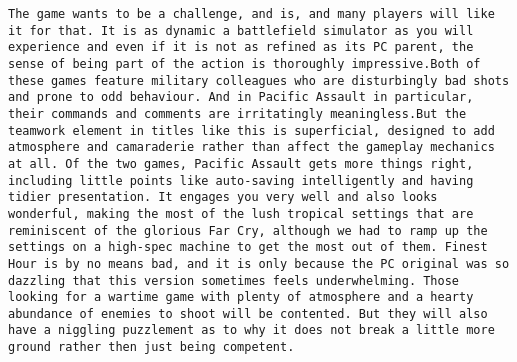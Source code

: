 \documentclass[11pt]{article}
\begin{document}
\begin{Verbatim}[commandchars=\\\{\}]
The game wants to be a challenge, and is, and many players will like it for that. It is as dynamic a battlefield simulator as you will experience and even if it is not as refined as its PC parent, the sense of being part of the action is thoroughly impressive.Both of these games feature military colleagues who are disturbingly bad shots and prone to odd behaviour. And in Pacific Assault in particular, their commands and comments are irritatingly meaningless.But the teamwork element in titles like this is superficial, designed to add atmosphere and camaraderie rather than affect the gameplay mechanics at all. Of the two games, Pacific Assault gets more things right, including little points like auto-saving intelligently and having tidier presentation. It engages you very well and also looks wonderful, making the most of the lush tropical settings that are reminiscent of the glorious Far Cry, although we had to ramp up the settings on a high-spec machine to get the most out of them. Finest Hour is by no means bad, and it is only because the PC original was so dazzling that this version sometimes feels underwhelming. Those looking for a wartime game with plenty of atmosphere and a hearty abundance of enemies to shoot will be contented. But they will also have a niggling puzzlement as to why it does not break a little more ground rather then just being competent.                                                                                                                                                                                                                                                                                                                                                                                                                                                        

\end{Verbatim}
\end{document}
